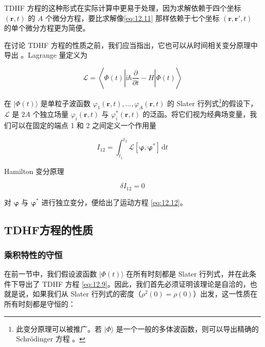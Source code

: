 TDHF 方程的这种形式在实际计算中更易于处理，因为求解依赖于四个坐标 $(\boldsymbol{r},t)$ 的 $A$ 个微分方程，要比求解像\ref{eq:12.11}
那样依赖于七个坐标 $(\boldsymbol{r},\boldsymbol{r}',t)$ 的单个微分方程更为简便。

在讨论 TDHF 方程的性质之前，我们应当指出，它也可以从时间相关变分原理中导出 \cite{KK76}。Lagrange 量定义为

\begin{equation}
\mathcal{L}=\left\langle \Phi(t)\left|\mathrm{i}\hbar\frac{\partial}{\partial t}-H\right|\Phi(t)\right\rangle \label{eq:12.14}
\end{equation}

在 $|\Phi(t)\rangle$ 是单粒子波函数 $\varphi_{1}(\boldsymbol{r},t),\dots,\varphi_{A}(\boldsymbol{r},t)$
的 Slater 行列式\footnote{此变分原理可以被推广。若 $|\Phi\rangle$ 是一个一般的多体波函数，则可以导出精确的 Schrödinger 方程 \cite{KK76}。}的假设下，$\mathcal{L}$
是 $2A$ 个独立场量 $\varphi_{i}(\boldsymbol{r},t)$ 与 $\varphi^{*}_{i}(\boldsymbol{r},t)$
的泛函。将它们视为经典场变量，我们可以在固定的端点 1 和 2 之间定义一个作用量

\begin{equation}
I_{12}=\int^{t_{2}}_{t_{1}}\mathcal{L}[\boldsymbol{\varphi},\boldsymbol{\varphi}^{*}]\,\mathrm{d}t\label{eq:12.15}
\end{equation}

Hamilton 变分原理 \cite{Go59}

\begin{equation}
\delta I_{12}=0\label{eq:12.16}
\end{equation}

对 $\boldsymbol{\varphi}$ 与 $\boldsymbol{\varphi}^{*}$ 进行独立变分，便给出了运动方程
\ref{eq:12.12}。

\subsection{TDHF方程的性质\label{subsec:12.2.2}}

\subsubsection{乘积特性的守恒\label{subsubsec:12.2.2.1}}

在前一节中，我们假设波函数 $|\Phi(t)\rangle$ 在所有时刻都是 Slater 行列式，并在此条件下导出了 TDHF
方程 \ref{eq:12.9}。因此，我们首先必须证明该理论是自洽的，也就是说，如果我们从 Slater 行列式的密度（$\rho^{2}(0)=\rho(0)$）出发，这一性质在所有时刻都是守恒的：

